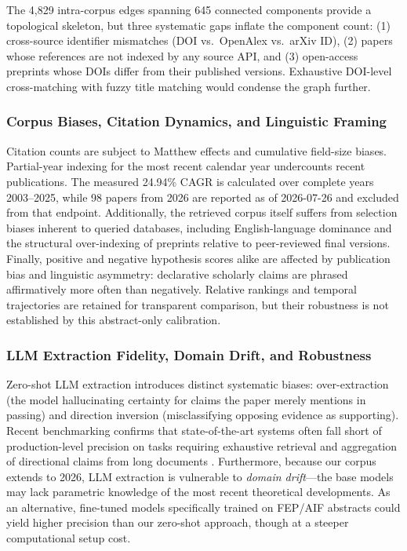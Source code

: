 \documentclass[
  english,
]{article}
\begin{document}
The 4,829 intra-corpus edges spanning 645 connected components provide a
topological skeleton, but three systematic gaps inflate the component
count: (1) cross-source identifier mismatches (DOI vs.~OpenAlex
vs.~arXiv ID), (2) papers whose references are not indexed by any source
API, and (3) open-access preprints whose DOIs differ from their
published versions. Exhaustive DOI-level cross-matching with fuzzy title
matching would condense the graph further.

\subsubsection{Corpus Biases, Citation Dynamics, and Linguistic
Framing}\label{corpus-biases-citation-dynamics-and-linguistic-framing}

Citation counts are subject to Matthew effects and cumulative field-size
biases. Partial-year indexing for the most recent calendar year
undercounts recent publications. The measured 24.94\% CAGR is calculated
over complete years 2003--2025, while 98 papers from 2026 are reported
as of 2026-07-26 and excluded from that endpoint. Additionally, the
retrieved corpus itself suffers from selection biases inherent to
queried databases, including English-language dominance and the
structural over-indexing of preprints relative to peer-reviewed final
versions. Finally, positive and negative hypothesis scores alike are
affected by publication bias and linguistic asymmetry: declarative
scholarly claims are phrased affirmatively more often than negatively.
Relative rankings and temporal trajectories are retained for transparent
comparison, but their robustness is not established by this
abstract-only calibration.

\subsubsection{LLM Extraction Fidelity, Domain Drift, and
Robustness}\label{llm-extraction-fidelity-domain-drift-and-robustness}

Zero-shot LLM extraction introduces distinct systematic biases:
over-extraction (the model hallucinating certainty for claims the paper
merely mentions in passing) and direction inversion (misclassifying
opposing evidence as supporting). Recent benchmarking confirms that
state-of-the-art systems often fall short of production-level precision
on tasks requiring exhaustive retrieval and aggregation of directional
claims from long documents \citep{liang2024survey}. Furthermore, because
our corpus extends to 2026, LLM extraction is vulnerable to \emph{domain
drift}---the base models may lack parametric knowledge of the most
recent theoretical developments. As an alternative, fine-tuned models
specifically trained on FEP/AIF abstracts could yield higher precision
than our zero-shot approach, though at a steeper computational setup
cost.
\end{document}
